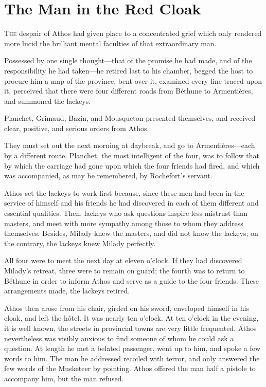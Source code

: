 
\chapter{The Man in the Red Cloak}

\lettrine[]{T}{he} despair of Athos had given place to a concentrated grief which only rendered more lucid the brilliant mental faculties of that extraordinary man. 

Possessed by one single thought---that of the promise he had made, and of the responsibility he had taken---he retired last to his chamber, begged the host to procure him a map of the province, bent over it, examined every line traced upon it, perceived that there were four different roads from Béthune to Armentières, and summoned the lackeys. 

Planchet, Grimaud, Bazin, and Mousqueton presented themselves, and received clear, positive, and serious orders from Athos. 

They must set out the next morning at daybreak, and go to Armentières---each by a different route. Planchet, the most intelligent of the four, was to follow that by which the carriage had gone upon which the four friends had fired, and which was accompanied, as may be remembered, by Rochefort's servant. 

Athos set the lackeys to work first because, since these men had been in the service of himself and his friends he had discovered in each of them different and essential qualities. Then, lackeys who ask questions inspire less mistrust than masters, and meet with more sympathy among those to whom they address themselves. Besides, Milady knew the masters, and did not know the lackeys; on the contrary, the lackeys knew Milady perfectly. 

All four were to meet the next day at eleven o'clock. If they had discovered Milady's retreat, three were to remain on guard; the fourth was to return to Béthune in order to inform Athos and serve as a guide to the four friends. These arrangements made, the lackeys retired. 

Athos then arose from his chair, girded on his sword, enveloped himself in his cloak, and left the hôtel. It was nearly ten o'clock. At ten o'clock in the evening, it is well known, the streets in provincial towns are very little frequented. Athos nevertheless was visibly anxious to find someone of whom he could ask a question. At length he met a belated passenger, went up to him, and spoke a few words to him. The man he addressed recoiled with terror, and only answered the few words of the Musketeer by pointing. Athos offered the man half a pistole to accompany him, but the man refused. 

